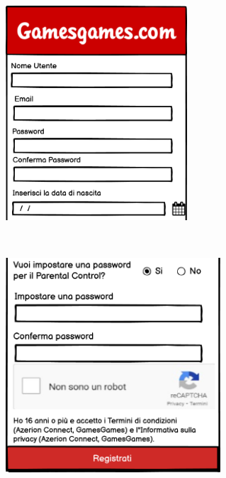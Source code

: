 \documentclass[../Report.tex]{subfiles}
\begin{document}
    \begin{figure}[H]
        \hspace{-1.5cm}
        \begin{minipage}[b]{8cm}
            \centering
            \includegraphics[height=8cm]{WRegisterLogin_1.png}
        \end{minipage}
        \ \hspace{1mm} \hspace{1mm} \
        \begin{minipage}[b]{8cm}
            \centering
            \includegraphics[height=8cm]{WRegisterLogin_2.png}
        \end{minipage}
    \end{figure}
\end{document}
